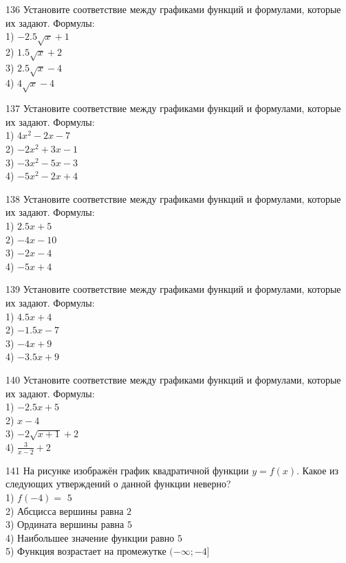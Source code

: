 \documentclass[4apaper]{article}
\begin{document}
\begin{taskBN}{136}
Установите соответствие между графиками функций и формулами, которые их задают. Формулы: \\1) $-2.5\sqrt{x}+1$\\2) $1.5\sqrt{x}+2$\\3) $2.5\sqrt{x}-4$\\4) $4\sqrt{x}-4$
\end{taskBN}

\begin{taskBN}{137}
Установите соответствие между графиками функций и формулами, которые их задают. Формулы: \\1) $4x^2-2x-7$\\2) $-2x^2+3x-1$\\3) $-3x^2-5x-3$\\4) $-5x^2-2x+4$
\end{taskBN}

\begin{taskBN}{138}
Установите соответствие между графиками функций и формулами, которые их задают. Формулы: \\1) $2.5x+5$\\2) $-4x-10$\\3) $-2x-4$\\4) $-5x+4$
\end{taskBN}

\begin{taskBN}{139}
Установите соответствие между графиками функций и формулами, которые их задают. Формулы: \\1) $4.5x+4$\\2) $-1.5x-7$\\3) $-4x+9$\\4) $-3.5x+9$
\end{taskBN}

\begin{taskBN}{140}
Установите соответствие между графиками функций и формулами, которые их задают. Формулы: \\1) $-2.5x+5$\\2) $x-4$\\3) $-2\sqrt{x+1}+2$\\4) $\frac{3}{x-2}+2$
\end{taskBN}

\begin{taskBN}{141}
На рисунке изображён график квадратичной функции $y=f(x)$. Какое из следующих утверждений о данной функции неверно?\\1) $f(-4)=$ $5$\\2) Абсцисса вершины равна $2$\\3) Ордината вершины равна $5$\\4) Наибольшее значение функции равно  $5$\\5) Функция возрастает на промежутке $(-\infty;-4]$
\end{taskBN}
\end{document}
